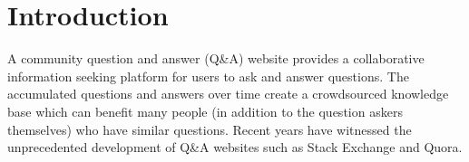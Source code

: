 \section{Introduction}
A community question and answer (Q\&A) website provides a collaborative information seeking platform for users to ask and answer questions.
The accumulated questions and answers over time create a crowdsourced knowledge base which can benefit many people (in addition to the question askers themselves) who have similar questions.
Recent years have witnessed the unprecedented development of Q\&A websites such as Stack Exchange and Quora. 


